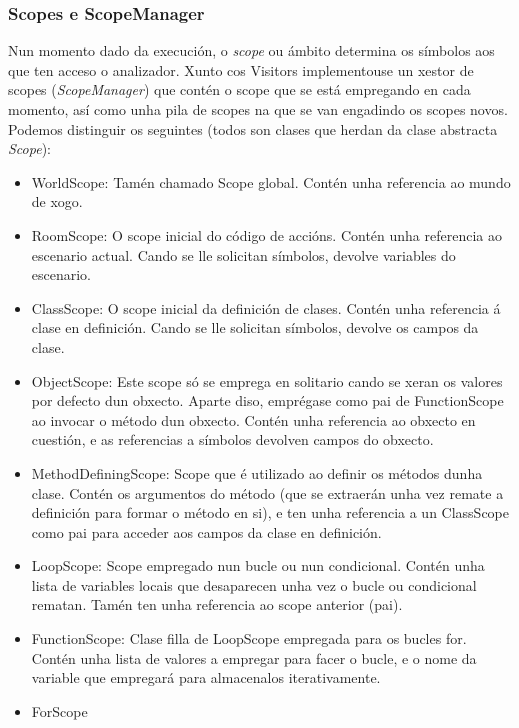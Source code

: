\subsubsection{Scopes e ScopeManager}
Nun momento dado da execución, o \textit{scope} ou ámbito determina os símbolos
aos que ten acceso o analizador. Xunto cos Visitors implementouse un xestor de
scopes (\textit{ScopeManager}) que contén o scope que se está empregando en cada
momento, así como unha pila de scopes na que se van engadindo os scopes novos.
Podemos distinguir os seguintes (todos son clases que herdan da clase abstracta
\textit{Scope}):
\begin{itemize}
  \item WorldScope: Tamén chamado Scope global. Contén unha referencia ao mundo
  de xogo.
  \item RoomScope: O scope inicial do código de accións. Contén unha referencia
  ao escenario actual. Cando se lle solicitan símbolos, devolve variables do
  escenario.
  \item ClassScope: O scope inicial da definición de clases. Contén unha
  referencia á clase en definición. Cando se lle solicitan símbolos, devolve os
  campos da clase.
  \item ObjectScope: Este scope só se emprega en solitario cando se xeran os
  valores por defecto dun obxecto. Aparte diso, emprégase como pai de
  FunctionScope ao invocar o método dun obxecto. Contén unha referencia ao
  obxecto en cuestión, e as referencias a símbolos devolven campos do obxecto.
  \item MethodDefiningScope: Scope que é utilizado ao definir os métodos dunha
  clase. Contén os argumentos do método (que se extraerán unha vez remate a
  definición para formar o método en si), e ten unha referencia a un ClassScope
  como pai para acceder aos campos da clase en definición.
  \item LoopScope: Scope empregado nun bucle ou nun condicional. Contén unha
  lista de variables locais que desaparecen unha vez o bucle ou condicional
  rematan. Tamén ten unha referencia ao scope anterior (pai).
  \item FunctionScope: Clase filla de LoopScope empregada para os bucles for.
  Contén unha lista de valores a empregar para facer o bucle, e o nome da
  variable que empregará para almacenalos iterativamente.
  \item ForScope
\end{itemize}

